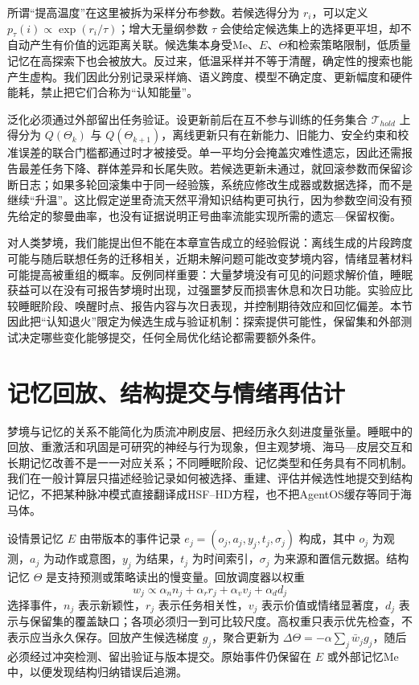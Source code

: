 所谓“提高温度”在这里被拆为采样分布参数。若候选得分为 $r_i$，可以定义 $p_\tau(i)\propto\exp(r_i/\tau)$；增大无量纲参数 $\tau$ 会使给定候选集上的选择更平坦，却不自动产生有价值的远距离关联。候选集本身受Me、$E$、$\Theta$和检索策略限制，低质量记忆在高探索下也会被放大。反过来，低温采样并不等于清醒，确定性的搜索也能产生虚构。我们因此分别记录采样熵、语义跨度、模型不确定度、更新幅度和硬件能耗，禁止把它们合称为“认知能量”。

泛化必须通过外部留出任务验证。设更新前后在互不参与训练的任务集合 $\mathcal T_{hold}$ 上得分为 $Q(\Theta_k)$ 与 $Q(\Theta_{k+1})$，离线更新只有在新能力、旧能力、安全约束和校准误差的联合门槛都通过时才被接受。单一平均分会掩盖灾难性遗忘，因此还需报告最差任务下降、群体差异和长尾失败。若候选更新未通过，就回滚参数而保留诊断日志；如果多轮回滚集中于同一经验簇，系统应修改生成器或数据选择，而不是继续“升温”。这比假定逆里奇流天然平滑知识结构更可执行，因为参数空间没有预先给定的黎曼曲率，也没有证据说明正号曲率流能实现所需的遗忘—保留权衡。

对人类梦境，我们能提出但不能在本章宣告成立的经验假说：离线生成的片段跨度可能与随后联想任务的迁移相关，近期未解问题可能改变梦境内容，情绪显著材料可能提高被重组的概率。反例同样重要：大量梦境没有可见的问题求解价值，睡眠获益可以在没有可报告梦境时出现，过强噩梦反而损害休息和次日功能。实验应比较睡眠阶段、唤醒时点、报告内容与次日表现，并控制期待效应和回忆偏差。本节因此把“认知退火”限定为候选生成与验证机制：探索提供可能性，保留集和外部测试决定哪些变化能够提交，任何全局优化结论都需要额外条件。

\section{记忆回放、结构提交与情绪再估计}
\label{sec:section_9179}
梦境与记忆的关系不能简化为质流冲刷皮层、把经历永久刻进度量张量。睡眠中的回放、重激活和巩固是可研究的神经与行为现象，但主观梦境、海马—皮层交互和长期记忆改善不是一一对应关系；不同睡眠阶段、记忆类型和任务具有不同机制。我们在一般计算层只描述经验记录如何被选择、重建、评估并候选性地提交到结构记忆，不把某种脉冲模式直接翻译成HSF--HD方程，也不把AgentOS缓存等同于海马体。

设情景记忆 $E$ 由带版本的事件记录 $e_j=(o_j,a_j,y_j,t_j,\sigma_j)$ 构成，其中 $o_j$ 为观测，$a_j$ 为动作或意图，$y_j$ 为结果，$t_j$ 为时间索引，$\sigma_j$ 为来源和置信元数据。结构记忆 $\Theta$ 是支持预测或策略读出的慢变量。回放调度器以权重
\[
w_j\propto \alpha_n n_j+\alpha_r r_j+\alpha_v v_j+\alpha_d d_j
\]
选择事件，$n_j$ 表示新颖性，$r_j$ 表示任务相关性，$v_j$ 表示价值或情绪显著度，$d_j$ 表示与保留集的覆盖缺口；各项必须归一到可比较尺度。高权重只表示优先检查，不表示应当永久保存。回放产生候选梯度 $g_j$，聚合更新为 $\Delta\Theta=-\alpha\sum_j\bar w_j g_j$，随后必须经过冲突检测、留出验证与版本提交。原始事件仍保留在 $E$ 或外部记忆Me中，以便发现结构归纳错误后追溯。

